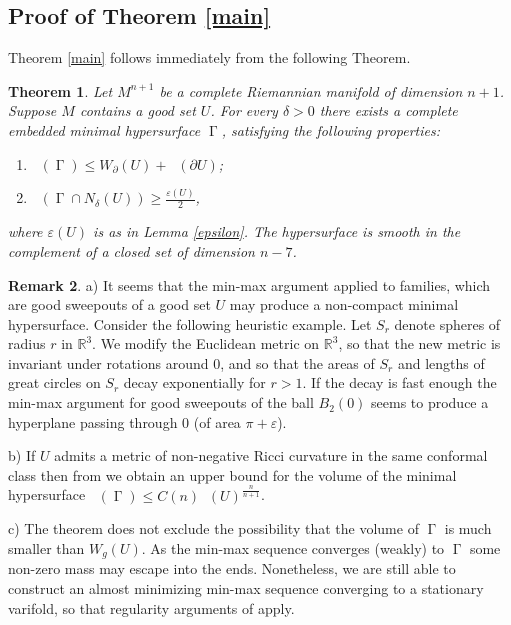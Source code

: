 \documentclass[12pt]{amsart}
\newtheorem{theorem}{Theorem}[section]
\DeclareMathOperator{\Hn}{\mathcal{H}^n}
\DeclareMathOperator{\Hnn}{\mathcal{H}^{n+1}}
\DeclareMathOperator{\G}{\Gamma}
\theoremstyle{definition}
\newtheorem{remark}[theorem]{Remark}
\begin{document}
\subsection{Proof of Theorem \ref*{main}}
Theorem \ref*{main} follows immediately from 
the following Theorem.


\begin{theorem} \label{main_full}
Let $M^{n+1}$ be a complete Riemannian
manifold of dimension $n+1$.
Suppose $M$ contains a good set $U$.
For every $\delta>0$ there exists a 
complete embedded minimal hypersurface $\G$,
satisfying the following properties:
\begin{enumerate}
    \item $\Hn(\G) \leq W_{\partial}(U) + \Hn(\partial U)$;
    \item $\Hn(\G \cap N_{\delta}(U)) \geq \frac{\varepsilon(U)}{2}$,
\end{enumerate}
where $\varepsilon(U)$ is as in Lemma \ref*{epsilon}.
The hypersurface is smooth
in the complement of a closed set of dimension $n-7$.
\end{theorem}

\begin{remark} \label{main_remark}
a) It seems that the min-max argument applied
to families, which are good sweepouts of a good set $U$
may produce a non-compact minimal hypersurface.
Consider the following heuristic example.
Let $S_r$ denote spheres of radius $r$ in $\mathbb{R}^3$.
We modify the Euclidean metric on $\mathbb{R}^3$,
so that the new metric is invariant under rotations around $0$,
and so that the areas of $S_r$ and lengths of great circles on $S_r$ decay exponentially
for $r>1$. If the decay is fast enough the min-max argument for
good sweepouts of the ball $B_2(0)$ seems to produce 
a hyperplane passing through $0$ (of area $\pi + \varepsilon$).

b) If $U$ admits a
metric of non-negative Ricci curvature in the same conformal class
then from \cite{GL} we obtain an
upper bound for the volume of the minimal hypersurface
$\Hn(\G)\leq C(n) \Hnn(U)^{\frac{n}{n+1}}$.

c) The theorem does not exclude the possibility
that the volume of $\G$ is much smaller than $W_g(U)$.
As the min-max sequence converges (weakly) to $\G$ some 
non-zero mass may escape into the ends. 
Nonetheless, we are still able to construct
an almost minimizing min-max sequence converging
to a stationary varifold, so that
regularity arguments of \cite{Pi} apply.
\end{remark}
\end{document}
